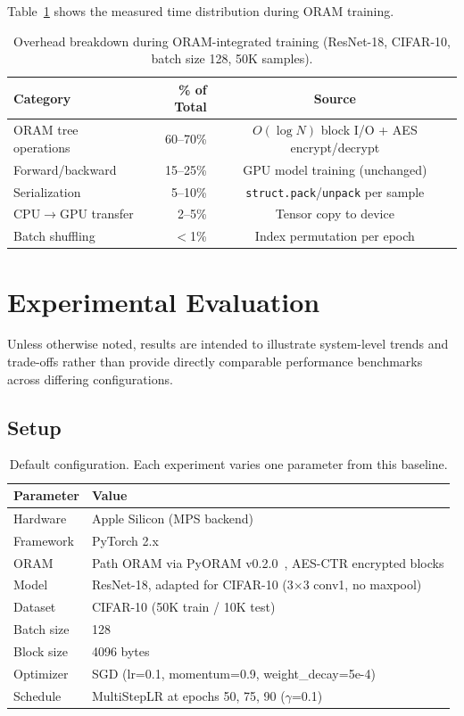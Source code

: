 \documentclass{llncs}
\begin{document}
Table~\ref{tab:breakdown} shows the measured time distribution during ORAM training.

\begin{table}[t]
\centering
\caption{Overhead breakdown during ORAM-integrated training (ResNet-18, CIFAR-10, batch size 128, 50K samples).}
\label{tab:breakdown}
\small
\begin{tabular}{@{}lrc@{}}
\toprule
\textbf{Category} & \textbf{\% of Total} & \textbf{Source} \\
\midrule
ORAM tree operations   & 60--70\% & $O(\log N)$ block I/O + AES encrypt/decrypt \\
Forward/backward       & 15--25\% & GPU model training (unchanged) \\
Serialization          & 5--10\%  & \texttt{struct.pack}/\texttt{unpack} per sample \\
CPU$\to$GPU transfer   & 2--5\%   & Tensor copy to device \\
Batch shuffling        & $<$1\%   & Index permutation per epoch \\
\bottomrule
\end{tabular}
\end{table}

\section{Experimental Evaluation}
\label{sec:eval}

Unless otherwise noted, results are intended to illustrate system-level trends and trade-offs rather than provide directly comparable performance benchmarks across differing configurations.

\subsection{Setup}

\begin{table}[t]
\centering
\caption{Default configuration. Each experiment varies one parameter from this baseline.}
\label{tab:platform}
\small
\begin{tabular}{@{}ll@{}}
\toprule
\textbf{Parameter} & \textbf{Value} \\
\midrule
Hardware      & Apple Silicon (MPS backend) \\
Framework     & PyTorch 2.x \\
ORAM          & Path ORAM via PyORAM v0.2.0~\cite{pyoram}, AES-CTR encrypted blocks \\
Model         & ResNet-18, adapted for CIFAR-10 (3$\times$3 conv1, no maxpool) \\
Dataset       & CIFAR-10 (50K train / 10K test) \\
Batch size    & 128 \\
Block size    & 4096 bytes \\
Optimizer     & SGD (lr=0.1, momentum=0.9, weight\_decay=5e-4) \\
Schedule      & MultiStepLR at epochs 50, 75, 90 ($\gamma$=0.1) \\
\bottomrule
\end{tabular}
\end{table}
\end{document}
